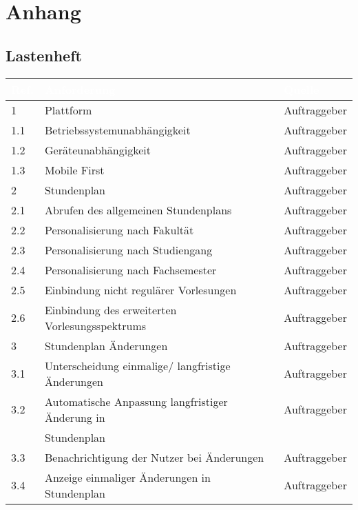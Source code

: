 
\chapter*{Anhang}


\section*{Lastenheft}

\begin{table}[H]
\begin{center}
  \begin{tabular}{| l | l | l |}

\hline
\rowcolor{Gray}
\textcolor{white}{\textbf{Ref.}} & \textcolor{white}{\textbf{Anforderung}} & \textcolor{white}{\textbf{Quelle}} \\ 

\hline
\rowcolor{LGray}
1		& Plattform						& Auftraggeber \\
\hline
1.1		& Betriebssystemunabhängigkeit 	& Auftraggeber \\
\hline
1.2	 	& Geräteunabhängigkeit			& Auftraggeber \\
\hline
1.3		& Mobile First					& Auftraggeber \\

\hline    
\rowcolor{LGray} 						
2		& Stundenplan 										& Auftraggeber \\
\hline
2.1		& Abrufen des allgemeinen Stundenplans				& Auftraggeber \\
\hline
2.2		& Personalisierung nach Fakultät					& Auftraggeber \\
\hline
2.3		& Personalisierung nach Studiengang					& Auftraggeber \\
\hline
2.4		& Personalisierung nach Fachsemester 				& Auftraggeber \\
\hline
2.5		& Einbindung nicht regulärer Vorlesungen			& Auftraggeber \\
\hline
2.6		& Einbindung des erweiterten Vorlesungsspektrums	& Auftraggeber \\

\hline    
\rowcolor{LGray} 						
3		& Stundenplan Änderungen								& Auftraggeber \\
\hline
3.1		& Unterscheidung einmalige/ langfristige Änderungen		& Auftraggeber \\
\hline
3.2		& Automatische Anpassung langfristiger Änderung in 		& Auftraggeber \\
		& Stundenplan											& 			   \\
\hline
3.3		& Benachrichtigung der Nutzer bei Änderungen			& Auftraggeber \\
\hline
3.4		& Anzeige einmaliger Änderungen in Stundenplan			& Auftraggeber \\
\hline


\end{tabular}
\end{center}
\end{table}

